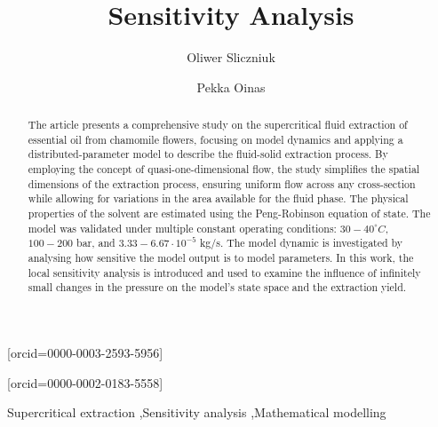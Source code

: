 \documentclass[a4paper,fleqn]{cas-dc}
\begin{document}
 

\title[mode=title]{Sensitivity Analysis}                      


\author[1]{Oliwer Sliczniuk}[orcid=0000-0003-2593-5956]
\cormark[1]

\author[1]{Pekka Oinas}[orcid=0000-0002-0183-5558]


\address[1]{Aalto University, School of Chemical Engineering, Espoo, 02150, Finland}


\begin{abstract}
The article presents a comprehensive study on the supercritical fluid extraction of essential oil from chamomile flowers, focusing on model dynamics and applying a distributed-parameter model to describe the fluid-solid extraction process. By employing the concept of quasi-one-dimensional flow, the study simplifies the spatial dimensions of the extraction process, ensuring uniform flow across any cross-section while allowing for variations in the area available for the fluid phase. The physical properties of the solvent are estimated using the Peng-Robinson equation of state. The model was validated under multiple constant operating conditions: $30 - 40^\circ C$, $100 - 200$ bar, and $3.33-6.67 \cdot 10^{-5}$ kg/s. The model dynamic is investigated by analysing how sensitive the model output is to model parameters. In this work, the local sensitivity analysis is introduced and used to examine the influence of infinitely small changes in the pressure on the model's state space and the extraction yield.

\end{abstract}

\begin{keywords}
Supercritical extraction \sep Sensitivity analysis \sep Mathematical modelling
\end{keywords}

\maketitle
\end{document}
